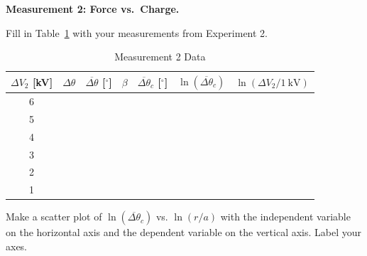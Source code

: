\documentclass[addpoints]{physlabs}
\begin{document}
\begin{postlab}
\question[4] \textbf{Measurement 2: Force vs.\ Charge.}

Fill in Table~\ref{tab: measurement 2 data} with your measurements from Experiment 2.

\begin{table}[ht]
    \captionsetup{font=normalsize, textfont=bf}
    \centering
    \caption{Measurement 2 Data}
    \renewcommand{\arraystretch}{2.0}
    \begin{tabular}{|c|>{\centering}p{4.5cm}|>{\centering}p{1.2cm}|>{\centering}p{1cm}|>{\centering}p{1.2cm}|>{\centering}p{1.2cm}|c|}
        \hline
        \rowcolor{EverButter}
        $\Delta V_2$ [kV] & $\Delta\theta$ & $\overline{\Delta\theta}$ [$^\circ$] & $\beta$ & $\overline{\Delta\theta}_c$ [$^\circ$] & $\ln{(\overline{\Delta\theta}_c)}$ & $\ln{(\Delta V_2/\qty{1}{\kilo\volt})}$
        \\
        \hline
        6 & & & & & &
        \\
        \hline
        5 & & & & & &
        \\
        \hline
        4 & & & & & &
        \\
        \hline
        3 & & & & & &
        \\
        \hline
        2 & & & & & &
        \\
        \hline
        1 & & & & & &
        \\
        \hline
    \end{tabular}
    \renewcommand{\arraystretch}{1.0}
    \label{tab: measurement 2 data}
\end{table}

\newpage

\question[3] Make a scatter plot of $\ln{(\overline{\Delta\theta}_c)}$ vs. $\ln{(r/a)}$ with the independent variable on the horizontal axis and the dependent variable on the vertical axis. Label your axes.
    \begin{center}
    \end{center}


\end{postlab}
\end{document}
